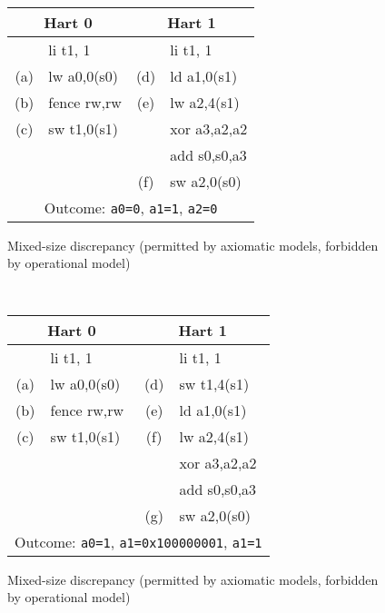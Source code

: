 \begin{figure}[h!]
  \centering\small
  {\tt
    \begin{tabular}{cl||cl}
    \multicolumn{2}{c}{Hart 0} & \multicolumn{2}{c}{Hart 1} \\
    \hline
          & li t1, 1    &     & li t1, 1      \\
      (a) & lw a0,0(s0) & (d) & ld a1,0(s1)   \\
      (b) & fence rw,rw & (e) & lw a2,4(s1)   \\
      (c) & sw t1,0(s1) &     & xor a3,a2,a2  \\
          &             &     & add s0,s0,a3  \\
          &             & (f) & sw a2,0(s0)   \\
      \hline
      \multicolumn{4}{c}{Outcome: {\tt a0=0}, {\tt a1=1}, {\tt a2=0}}
    \end{tabular}
  }
  \caption{Mixed-size discrepancy (permitted by axiomatic models, forbidden by operational model)}
  \label{fig:litmus:discrepancy:rsw2}
\end{figure}

\begin{figure}[h!]
  \centering\small
  {\tt
    \begin{tabular}{cl||cl}
    \multicolumn{2}{c}{Hart 0} & \multicolumn{2}{c}{Hart 1} \\
    \hline
          & li t1, 1    &     & li t1, 1      \\
      (a) & lw a0,0(s0) & (d) & sw t1,4(s1)   \\
      (b) & fence rw,rw & (e) & ld a1,0(s1)   \\
      (c) & sw t1,0(s1) & (f) & lw a2,4(s1)   \\
          &             &     & xor a3,a2,a2  \\
          &             &     & add s0,s0,a3  \\
          &             & (g) & sw a2,0(s0)   \\
      \hline
      \multicolumn{4}{c}{Outcome: {\tt a0=1}, {\tt a1=0x100000001}, {\tt a1=1}}
    \end{tabular}
  }
  \caption{Mixed-size discrepancy (permitted by axiomatic models, forbidden by operational model)}
  \label{fig:litmus:discrepancy:rsw3}
\end{figure}

